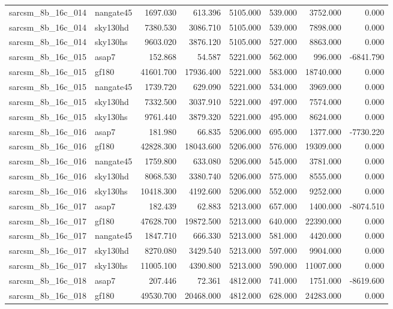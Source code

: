 \begin{tabular}{llrrrrrr}
sarcsm\_8b\_16c\_014 & nangate45 & 1697.030 & 613.396 & 5105.000 & 539.000 & 3752.000 & 0.000 \\
sarcsm\_8b\_16c\_014 & sky130hd & 7380.530 & 3086.710 & 5105.000 & 539.000 & 7898.000 & 0.000 \\
sarcsm\_8b\_16c\_014 & sky130hs & 9603.020 & 3876.120 & 5105.000 & 527.000 & 8863.000 & 0.000 \\
sarcsm\_8b\_16c\_015 & asap7 & 152.868 & 54.587 & 5221.000 & 562.000 & 996.000 & -6841.790 \\
sarcsm\_8b\_16c\_015 & gf180 & 41601.700 & 17936.400 & 5221.000 & 583.000 & 18740.000 & 0.000 \\
sarcsm\_8b\_16c\_015 & nangate45 & 1739.720 & 629.090 & 5221.000 & 534.000 & 3969.000 & 0.000 \\
sarcsm\_8b\_16c\_015 & sky130hd & 7332.500 & 3037.910 & 5221.000 & 497.000 & 7574.000 & 0.000 \\
sarcsm\_8b\_16c\_015 & sky130hs & 9761.440 & 3879.320 & 5221.000 & 495.000 & 8624.000 & 0.000 \\
sarcsm\_8b\_16c\_016 & asap7 & 181.980 & 66.835 & 5206.000 & 695.000 & 1377.000 & -7730.220 \\
sarcsm\_8b\_16c\_016 & gf180 & 42828.300 & 18043.600 & 5206.000 & 576.000 & 19309.000 & 0.000 \\
sarcsm\_8b\_16c\_016 & nangate45 & 1759.800 & 633.080 & 5206.000 & 545.000 & 3781.000 & 0.000 \\
sarcsm\_8b\_16c\_016 & sky130hd & 8068.530 & 3380.740 & 5206.000 & 575.000 & 8555.000 & 0.000 \\
sarcsm\_8b\_16c\_016 & sky130hs & 10418.300 & 4192.600 & 5206.000 & 552.000 & 9252.000 & 0.000 \\
sarcsm\_8b\_16c\_017 & asap7 & 182.439 & 62.883 & 5213.000 & 657.000 & 1400.000 & -8074.510 \\
sarcsm\_8b\_16c\_017 & gf180 & 47628.700 & 19872.500 & 5213.000 & 640.000 & 22390.000 & 0.000 \\
sarcsm\_8b\_16c\_017 & nangate45 & 1847.710 & 666.330 & 5213.000 & 581.000 & 4420.000 & 0.000 \\
sarcsm\_8b\_16c\_017 & sky130hd & 8270.080 & 3429.540 & 5213.000 & 597.000 & 9904.000 & 0.000 \\
sarcsm\_8b\_16c\_017 & sky130hs & 11005.100 & 4390.800 & 5213.000 & 590.000 & 11007.000 & 0.000 \\
sarcsm\_8b\_16c\_018 & asap7 & 207.446 & 72.361 & 4812.000 & 741.000 & 1751.000 & -8619.600 \\
sarcsm\_8b\_16c\_018 & gf180 & 49530.700 & 20468.000 & 4812.000 & 628.000 & 24283.000 & 0.000 \\

\end{tabular}
